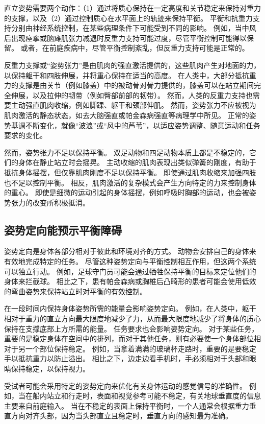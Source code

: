 直立姿势需要两个动作：（1）通过将质心保持在一定高度和关节稳定来保持对重力的支撑，以及（2）通过控制质心在水平面上的轨迹来保持平衡。 平衡和抗重力支持分别由神经系统控制，在某些病理条件下可能受到不同的影响。 例如，当中风后出现痉挛或脑瘫肌张力减退时反重力支持可能过度，尽管平衡控制可能得以保留。 或者，在前庭疾病中，尽管平衡控制紊乱，但反重力支持可能是正常的。

反重力支撑或“姿势张力”是由肌肉的强直激活提供的，这些肌肉产生对地面的力，以保持躯干和四肢伸展，并将重心保持在适当的高度。 在人类中，大部分抵抗重力的支撑是由关节（例如膝盖）中的被动骨对骨力提供的，膝盖可以在站立期间完全伸展，以及拉伸的韧带（例如臀部前部的韧带）。 然而，人类的反重力支持也需要主动强直肌肉收缩，例如脚踝、躯干和颈部伸肌。 然而，姿势张力不应被视为肌肉激活的静态状态，如去大脑强直或帕金森病强直等病理学中所见。 正常的姿势基调不断变化，就像“波浪”或“风中的芦苇”，以适应姿势调整、随意运动和任务要求的变化。

然而，姿势张力不足以保持平衡。 双足动物和四足动物本质上都是不稳定的，它们的身体在静止站立时会摇晃。 主动收缩的肌肉表现出类似弹簧的刚度，有助于抵抗身体摇摆，但仅靠肌肉刚度不足以保持平衡。 即使通过肌肉收缩来加强四肢也不足以控制平衡。 相反，肌肉激活的复杂模式会产生方向特定的力来控制身体的重心。 即使是细微的运动引起的身体摇摆，例如呼吸时胸部的运动，也会被姿势张力的改变所积极抵消。


\subsection{姿势定向能预示平衡障碍}
姿势定向是身体各部分相对于彼此和环境对齐的方式。 动物会安排自己的身体来有效地完成特定的任务。 尽管这种姿势定向与平衡控制相互作用，但这两个系统可以独立行动。 例如，足球守门员可能会通过牺牲保持平衡的目标来定位他们的身体来拦截球。 相比之下，患有帕金森病或胸椎后凸畸形的患者可能会使用低效的弯曲姿势来保持站立时对平衡的有效控制。

在一段时间内保持身体姿势所需的能量会影响姿势定向。 例如，在人类中，躯干相对于重力的直立方向最大限度地减少了力，从而最大限度地减少了将身体的质心保持在支撑底部上方所需的能量。 任务要求也会影响姿势定向。 对于某些任务，重要的是稳定身体在空间中的排列，而对于其他任务，则有必要使一个身体部位相对于另一个部位保持稳定。 例如，当拿着满满的玻璃杯走路时，重要的是要稳定手以抵抗重力以防止溢出。 相比之下，边走边看手机时，手必须相对于头部和眼睛保持稳定，以保持视力。

受试者可能会采用特定的姿势定向来优化有关身体运动的感觉信号的准确性。 例如，当在船内站立和行走时，表面和视觉参考可能不稳定，有关地球垂直度的信息主要来自前庭输入。 当在不稳定的表面上保持平衡时，一个人通常会根据重力垂直方向对齐头部，因为当头部直立且稳定时，垂直方向的感知最为准确。

